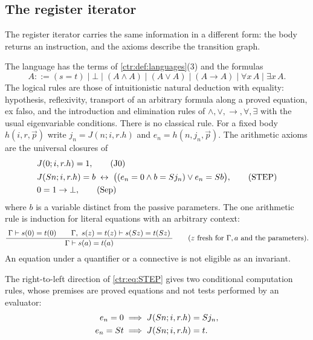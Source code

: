 \subsection{The register iterator}\label{ctr:sec:register}

The register iterator carries the same information in a different form: the body returns an
instruction, and the axioms describe the transition graph.

\begin{definition}\label{ctr:def:TJ}
The language has the terms of \cref{ctr:def:languages}(3) and the formulas
\[
 A ::= (s=t)\mid\bot\mid(A\land A)\mid(A\lor A)\mid(A\to A)\mid\forall x\,A\mid\exists x\,A .
\]
The logical rules are those of intuitionistic natural deduction with equality: hypothesis,
reflexivity, transport of an arbitrary formula along a proved equation, ex falso, and the
introduction and elimination rules of $\land,\lor,\to,\forall,\exists$ with the usual
eigenvariable conditions. There is no classical rule. For a fixed body $h(i,r,\vec p)$ write
$j_n=J(n;i,r.h)$ and $e_n=h(n,j_n,\vec p)$. The arithmetic axioms are the universal closures
of
\begin{align}
 & J(0;i,r.h)=1, \tag{J0}\label{ctr:eq:J0}\\
 & J(S n;i,r.h)=b \;\leftrightarrow\;
   \bigl((e_n=0\land b=S j_n)\lor e_n=S b\bigr), \tag{STEP}\label{ctr:eq:STEP}\\
 & 0=1\to\bot, \tag{Sep}\label{ctr:eq:Sep}
\end{align}
where $b$ is a variable distinct from the passive parameters. The one arithmetic rule is
induction for literal equations with an arbitrary context:
\begin{equation}\label{ctr:eq:EI}
 \dfrac{\;\Gamma\vdash s(0)=t(0)\qquad \Gamma,\ s(z)=t(z)\vdash s(S z)=t(S z)\;}{\;\Gamma\vdash s(a)=t(a)\;}
 \qquad (z \text{ fresh for } \Gamma,a \text{ and the parameters}).
\end{equation}
An equation under a quantifier or a connective is not eligible as an invariant.
\end{definition}

The right-to-left direction of \eqref{ctr:eq:STEP} gives two conditional computation rules,
whose premises are proved equations and not tests performed by an evaluator:
\begin{align}
 e_n=0 &\;\Longrightarrow\; J(S n;i,r.h)=S j_n, \label{ctr:eq:inc}\\
 e_n=S t &\;\Longrightarrow\; J(S n;i,r.h)=t. \label{ctr:eq:load}
\end{align}


